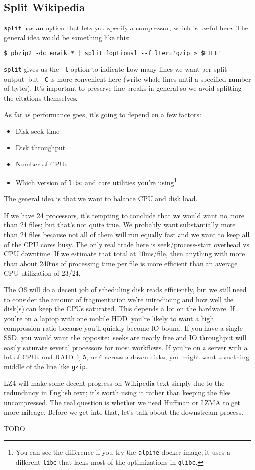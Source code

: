 \subsection{Split Wikipedia}
{\tt split} has an option that lets you specify a compressor, which is useful
here. The general idea would be something like this:

\begin{verbatim}
$ pbzip2 -dc enwiki* | split [options] --filter='gzip > $FILE'\end{verbatim}

{\tt split} gives us the {\tt -l} option to indicate how many lines we want per
split output, but {\tt -C} is more convenient here (write whole lines until a
specified number of bytes). It's important to preserve line breaks in general so
we avoid splitting the citations themselves.

As far as performance goes, it's going to depend on a few factors:

\begin{itemize}
  \item Disk seek time
  \item Disk throughput
  \item Number of CPUs
  \item Which version of {\tt libc} and core utilities you're using\footnote{You
    can see the difference if you try the {\tt alpine} docker image; it uses a
    different {\tt libc} that lacks most of the optimizations in {\tt glibc}.}
\end{itemize}

The general idea is that we want to balance CPU and disk load.

If we have 24 processors, it's tempting to conclude that we would want no more
than 24 files; but that's not quite true. We probably want substantially more
than 24 files because not all of them will run equally fast and we want to keep
all of the CPU cores busy. The only real trade here is seek/process-start
overhead vs CPU downtime. If we estimate that total at 10ms/file, then anything
with more than about 240ms of processing time per file is more efficient than an
average CPU utilization of 23/24.

The OS will do a decent job of scheduling disk reads efficiently, but we still
need to consider the amount of fragmentation we're introducing and how well the
disk(s) can keep the CPUs saturated. This depends a lot on the hardware. If
you're on a laptop with one mobile HDD, you're likely to want a high compression
ratio because you'll quickly become IO-bound. If you have a single SSD, you
would want the opposite:~seeks are nearly free and IO throughput will easily
saturate several processors for most workflows. If you're on a server with a lot
of CPUs and RAID-0, 5, or 6 across a dozen disks, you might want something
middle of the line like {\tt gzip}.

LZ4 will make some decent progress on Wikipedia text simply due to the
redundancy in English text; it's worth using it rather than keeping the files
uncompressed. The real question is whether we need Huffman or LZMA to get more
mileage. Before we get into that, let's talk about the downstream process.

TODO
